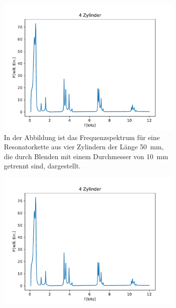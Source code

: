             \begin{figure}
                \centering
                \begin{subfigure}[b]{0.45\textwidth}
                    \centering
                    \includegraphics[scale=0.45]{./pictures/1dim_4_Zylinder_10mm.pdf}
                    \caption{In der Abbildung ist das Frequenzspektrum für eine Resonatorkette aus vier Zylindern der Länge \SI{50}{\milli\metre}, die durch Blenden mit einem Durchmesser von \SI{10}{\milli\metre} getrennt sind, dargestellt.}
                    \label{fig:1dim_4_Zylinder_10mm}
                \end{subfigure}
                \centering
                \begin{subfigure}[b]{0.45\textwidth}
                    \centering
                    \includegraphics[scale=0.45]{./pictures/1dim_4_Zylinder_13mm.pdf}

\end{subfigure}
\end{figure}

